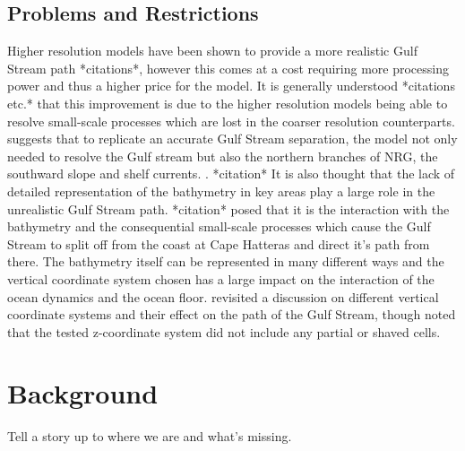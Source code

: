 \documentclass[a4paper,11pt]{article}
\begin{document}
\subsection{Problems and Restrictions}
Higher resolution models have been shown to provide a more realistic Gulf Stream path *citations*, however this comes at a cost requiring more processing power and thus a higher price for the model. It is generally understood *citations \citep{Nikurashin2012a} etc.* that this improvement is due to the higher resolution models being able to resolve small-scale processes which are lost in the coarser resolution counterparts. \citep{Ezer2016b} suggests that to replicate an accurate Gulf Stream separation, the model not only needed to resolve the Gulf stream but also the northern branches of NRG, the southward slope and shelf currents. . *citation* It is also thought that the lack of detailed representation of the bathymetry in key areas play a large role in the unrealistic Gulf Stream path. *citation* posed that it is the interaction with the bathymetry and the consequential small-scale processes which cause the Gulf Stream to split off from the coast at Cape Hatteras and direct it’s path from there. The bathymetry itself can be represented in many different ways and the vertical coordinate system chosen has a large impact on the interaction of the ocean dynamics and the ocean floor. \citep{Ezer2016b} revisited a discussion on different vertical coordinate systems and their effect on the path of the Gulf Stream, though noted that the tested z-coordinate system did not include any partial or shaved cells. 


\section{Background}
Tell a story up to where we are and what's missing.
\end{document}
